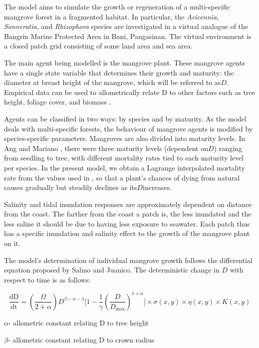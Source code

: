 The model aims to simulate the growth or regeneration of a
multi-specific mangrove forest in a fragmented habitat. In particular,
the \emph{Avicennia, Sonneratia,} and \emph{Rhizophora} species are
investigated in a virtual analogue of the Bangrin Marine Protected Area in
Bani, Pangasinan. The virtual environment is a closed patch grid consisting of
some land area and sea area.

The main agent being modelled is the mangrove plant. These mangrove agents
have a single state variable that determines their growth and maturity:
the diameter at breast height of the mangrove, which will be referred to
as\(D\). Empirical data can be used to allometrically relate D to other
factors such as tree height, foliage cover, and biomass \cite{Hiebeler2000}.

Agents can be classified in two ways: by species and by maturity. As the
model deals with multi-specific forests, the behaviour of mangrove
agents is modified by species-specific parameters. Mangroves are also
divided into maturity levels. In Ang and Mariano \cite{mangrovesAngMariano}, there were
three maturity levels (dependent on\(D\)) ranging from seedling to tree,
with different mortality rates tied to each maturity level per species. In
the present model, we obtain a Lagrange interpolated mortality rate from
the values used in \cite{mangrovesAngMariano}, so that a plant's chances of dying from natural causes gradually but steadily declines as its\(D\)increases.

Salinity and tidal inundation responses are approximately dependent on
distance from the coast. The farther from the coast a patch is, the less
inundated and the less saline it should be due to having less exposure
to seawater. Each patch thus has a specific inundation and salinity effect to the
growth of the mangrove plant on it.

The model's determination of individual mangrove growth follows the
differential equation proposed by Salmo and Juanico. The deterministic change in $D$ with respect to time is as follows:

\begin{dmath}
\frac{\text{dD}}{\text{dt}} = (\frac{\Omega}{2 + \alpha})D^{\beta - \alpha - 1}\lbrack 1 - \frac{1}{\gamma}{(\frac{D}{D_{\max}})}^{1 + \alpha}\rbrack \times \sigma(x,y) \times \eta(x,y) \times K(x,y)
\end{dmath}


\(\alpha\)- allometric constant relating D to tree height

\(\beta\)- allometric constant relating D to crown radius

